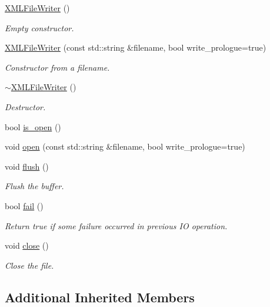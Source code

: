 \begin{DoxyCompactItemize}
\mbox{\hyperlink{classADATXML_1_1XMLFileWriter_a40db177b66a4598583a3a08e19c1e927}{X\+M\+L\+File\+Writer}} ()
\begin{DoxyCompactList}\small\item\em Empty constructor. \end{DoxyCompactList}\item 
\mbox{\hyperlink{classADATXML_1_1XMLFileWriter_a83cf749ff969a30d3de1895f271b238a}{X\+M\+L\+File\+Writer}} (const std\+::string \&filename, bool write\+\_\+prologue=true)
\begin{DoxyCompactList}\small\item\em Constructor from a filename. \end{DoxyCompactList}\item 
\mbox{\hyperlink{classADATXML_1_1XMLFileWriter_af3d1109d92631884682eac46624ca7fd}{$\sim$\+X\+M\+L\+File\+Writer}} ()
\begin{DoxyCompactList}\small\item\em Destructor. \end{DoxyCompactList}\item 
bool \mbox{\hyperlink{classADATXML_1_1XMLFileWriter_a60fa87bbd9300c37386f9fdcb9460f74}{is\+\_\+open}} ()
\item 
void \mbox{\hyperlink{classADATXML_1_1XMLFileWriter_a76f52e7ccdfe3b82875f30953cfd2447}{open}} (const std\+::string \&filename, bool write\+\_\+prologue=true)
\item 
void \mbox{\hyperlink{classADATXML_1_1XMLFileWriter_a63097bd3fafbcf99804b4106700b524d}{flush}} ()
\begin{DoxyCompactList}\small\item\em Flush the buffer. \end{DoxyCompactList}\item 
bool \mbox{\hyperlink{classADATXML_1_1XMLFileWriter_a0294354e26b7ad1be1ca75f470db4788}{fail}} ()
\begin{DoxyCompactList}\small\item\em Return true if some failure occurred in previous IO operation. \end{DoxyCompactList}\item 
void \mbox{\hyperlink{classADATXML_1_1XMLFileWriter_a1a51ceb51781ac6f3a476dcf99a75017}{close}} ()
\begin{DoxyCompactList}\small\item\em Close the file. \end{DoxyCompactList}\end{DoxyCompactItemize}
\subsection*{Additional Inherited Members}


